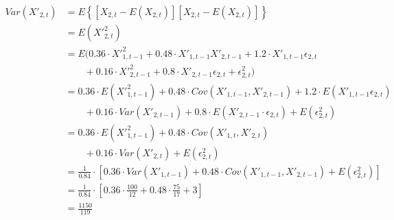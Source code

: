 \begin{solution}
\begin{equation}
\begin{aligned}
Var(X'_{2,t}) & = E\left\{[X_{2,t} - E(X_{2,t})][X_{2,t} - E(X_{2,t})]\right\} \\
							& = E({X'}_{2,t}^2) \\
							& = E(0.36 \cdot {X'}_{1,t-1}^2 + 0.48 \cdot X'_{1,t-1}X'_{2,t-1} + 1.2 \cdot X'_{1,t-1}\epsilon_{2,t} \\ 
							& \qquad				+ 0.16 \cdot {X'}_{2,t-1}^2 + 0.8 \cdot X'_{2,t-1}\epsilon_{2,t} 
							        				+ \epsilon_{2,t}^2 ) \\
							& = 0.36 \cdot E({X'}_{1,t-1}^2) + 0.48 \cdot Cov(X'_{1,t-1},X'_{2,t-1}) + 1.2 \cdot E(X'_{1,t-1}\epsilon_{2,t}) \\ 
							& \qquad				+ 0.16 \cdot Var(X'_{2,t-1}) + 0.8 \cdot E(X'_{2,t-1} \cdot \epsilon_{2,t}) 
							        				+ E(\epsilon_{2,t}^2)\\		
							& = 0.36 \cdot E({X'}_{1,t-1}^2) + 0.48 \cdot Cov(X'_{1,t},X'_{2,t})\\ 
							& \qquad				+ 0.16 \cdot Var(X'_{2,t}) 
							        				+ E(\epsilon_{2,t}^2)\\
							& = \frac{1}{0.84} \cdot [0.36 \cdot Var(X'_{1,t-1}) + 0.48 \cdot Cov(X'_{1,t-1},X'_{2,t-1}) + E(\epsilon_{2,t}^2)] \\
							& = \frac{1}{0.84} \cdot \left[0.36 \cdot \frac{100}{12} + 0.48 \cdot \frac{75}{17} + 3 \right] \\
							& = \frac{1150}{119}
\end{aligned}
\end{equation}

\end{solution}